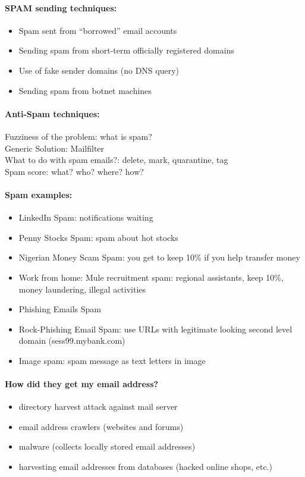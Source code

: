 \paragraph{SPAM sending techniques:}
\begin{itemize}
\item Spam sent from ``borrowed'' email accounts
\item Sending spam from short-term officially registered domains
\item Use of fake sender domains (no DNS query) 
\item Sending spam from botnet machines
\end{itemize}

\paragraph{Anti-Spam techniques:} Fuzziness of the problem: what is spam? \\
Generic Solution: Mailfilter\\
What to do with spam emails?: delete, mark, quarantine, tag\\
Spam score: what? who? where? how?

\paragraph{Spam examples:}
\begin{itemize}
\item LinkedIn Spam: notifications waiting
\item Penny Stocks Spam: spam about hot stocks
\item Nigerian Money Scam Spam: you get to keep 10\% if you help transfer money
\item Work from home: Mule recruitment spam: regional assistants, keep 10\%, money laundering, illegal activities
\item Phishing Emails Spam
\item Rock-Phishing Email Spam: use URLs with legitimate looking second level domain (sess99.mybank.com)
\item Image spam: spam message as text letters in image
\end{itemize}

\paragraph{How did they get my email address?}
\begin{itemize}
\item directory harvest attack against mail server
\item email address crawlers (websites and forums)
\item malware (collects locally stored email addresses)
\item harvesting email addresses from databases (hacked online shops, etc.)
\end{itemize}

